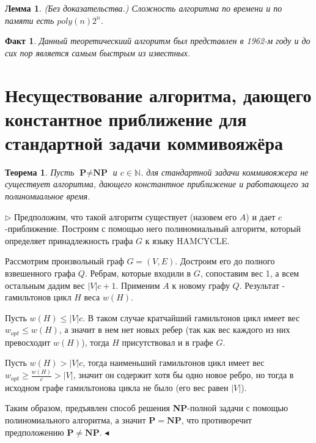 \documentclass[A4, twocolumn]{article}
\newtheorem{Fact}{Факт}
\newtheorem{Th}{Теорема}
\newtheorem{Lem}{Лемма}
\newenvironment{PROOF}
{\par\noindent{\bf Доказательство:}\newline$\triangleright$}
{\hfill$\scriptstyle\blacktriangleleft$}
\begin{document}
	\begin{Lem}{(Без доказательства.)}
		Сложность алгоритма по времени и по памяти есть $poly(n)2^n$.
	\end{Lem}

	\begin{Fact}
		Данный теоретическиий алгоритм был представлен в 1962-м году и до сих пор является самым быстрым из известных.
	\end{Fact}
	
	\section{\textbf{Несуществование алгоритма, дающего константное приближение для стандартной задачи коммивояжёра}}
	
	\begin{Th}
		Пусть  $\textbf{P} \ne \textbf{NP}$ и  $c \in \mathbb{N}$. для стандартной задачи коммивояжера не существует алгоритма, дающего константное приближение и работающего за полиномиальное время.	
	\end{Th}
	
	\begin{PROOF}
	Предположим, что такой алгоритм существует (назовем его $A$) и дает $c$-приближение. Построим с помощью него полиномиальный алгоритм, который определяет принадлежность графа $G$ к языку HAMCYCLE.
	
	Рассмотрим произвольный граф $G = (V, E)$. Достроим его до полного взвешенного графа $Q$. Ребрам, которые входили в $G$, сопоставим вес 1, а всем остальным дадим вес $|V|c + 1$. Применим $A$ к новому графу $Q$. Результат - гамильтонов цикл $H$ веса $w(H)$.
	
	Пусть $w(H) \leq |V|c$. В таком случае кратчайший гамильтонов цикл имеет вес $w_{opt} \leq w(H)$, а значит в нем нет новых ребер (так как вес каждого из них превосходит $w(H)$), тогда $H$ присутствовал и в графе $G$.
	
	Пусть $w(H) > |V|c$, тогда наименьший гамильтонов цикл имеет вес $w_{opt} \geq \frac{w(H)}{c} > |V|$, значит он содержит хотя бы одно новое ребро, но тогда в исходном графе гамильтонова цикла не было (его вес равен $|V|$).
	
	Таким образом, предъявлен способ решения \textbf{NP}-полной задачи с помощью полиномиального алгоритма, а значит $\mathbf{P} = \mathbf{NP}$, что противоречит предположению $\mathbf{P} \ne \mathbf{NP}$.	
	\end{PROOF}
\end{document}
